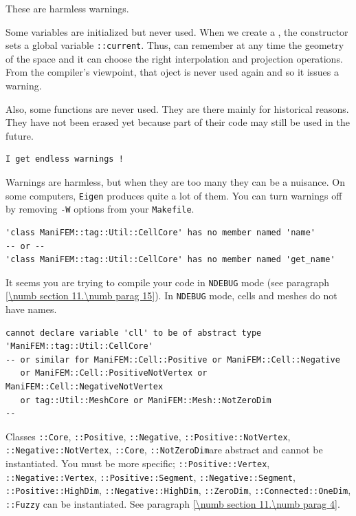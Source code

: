 These are harmless warnings.

Some variables are initialized but never used.
When we create a {\small\tt{}}, the constructor sets a global variable
{\small\tt{}::current}.
Thus, {\maniFEM} can remember at any time the geometry of the space and it can choose the right
interpolation and projection operations.
From the compiler's viewpoint, that {\small\tt{}} oject is never used again and
so it issues a warning.

Also, some functions are never used.
They are there mainly for historical reasons.
They have not been erased yet because part of their code may still be used in the future.

\begin{Verbatim}[commandchars=\\\{\},formatcom=\normalfont\rmfamily,baselinestretch=0.94]
I get endless warnings !
\end{Verbatim}

Warnings are harmless, but when they are too many they can be a nuisance.
On some computers, {\small\tt Eigen} produces quite a lot of them.
You can turn warnings off by removing {\small\tt -W} options from your {\small\tt Makefile}.

\begin{Verbatim}[commandchars=\\\{\},formatcom=\small\tt,baselinestretch=0.94]
'class ManiFEM::tag::Util::CellCore' has no member named 'name'
-- or --
'class ManiFEM::tag::Util::CellCore' has no member named 'get_name'
\end{Verbatim}

It seems you are trying to compile your code in {\small\tt NDEBUG} mode
(see paragraph \ref{\numb section 11.\numb parag 15}).
In {\small\tt NDEBUG} mode, cells and meshes do not have names.

\begin{Verbatim}[commandchars=\\\{\},formatcom=\small\tt,baselinestretch=0.94]
cannot declare variable 'cll' to be of abstract type 'ManiFEM::tag::Util::CellCore'
-- or similar for ManiFEM::Cell::Positive or ManiFEM::Cell::Negative
   or ManiFEM::Cell::PositiveNotVertex or ManiFEM::Cell::NegativeNotVertex
   or tag::Util::MeshCore or ManiFEM::Mesh::NotZeroDim                      --
\end{Verbatim}

Classes {\small\tt{}::Core}, {\small\tt{}::Positive},
{\small\tt{}::Negative}, {\small\tt{}::Positive::NotVertex},\hfil\break
{\small\tt{}::Negative::NotVertex}, {\small\tt{}::Core},
{\small\tt{}::NotZeroDim}are abstract and cannot be instantiated.
You must be more specific; {\small\tt{}::Positive::Vertex},
{\small\tt{}::Negative::Vertex},\hfil\break
{\small\tt{}::Positive::Segment},
{\small\tt{}::Negative::Segment}, {\small\tt{}::Positive::HighDim},
{\small\tt{}::Negative::HighDim}, {\small\tt{}::ZeroDim},
{\small\tt{}::Connected::OneDim}, {\small\tt{}::Fuzzy}
can be instantiated.
See paragraph \ref{\numb section 11.\numb parag 4}.



